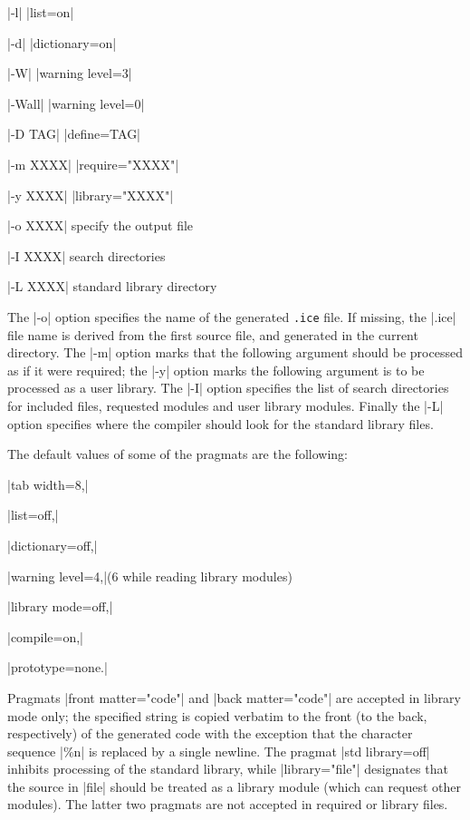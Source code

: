 \documentclass[titlepage]{article}
\begin{document}
\smallskip

\HH \pp|-l| \HE \pp|list=on|

\HH \pp|-d| \HE \pp|dictionary=on|

\HH \pp|-W| \HE \pp|warning level=3|

\HH \pp|-Wall| \HE \pp|warning level=0|

\HH \pp|-D TAG| \HE \pp|define=TAG|

\HH \pp|-m XXXX| \HE \pp|require="XXXX"|

\HH \pp|-y XXXX| \HE \pp|library="XXXX"|

\HH \pp|-o XXXX| \HE specify the output file

\HH \pp|-I XXXX| \HE search directories

\HH \pp|-L XXXX| \HE standard library directory

\smallskip
\noindent
The \pp|-o| option specifies the name of the generated \texttt{.ice} file.
If missing, the \pp|.ice| file name is derived from the first source file,
and generated in the current directory. The \pp|-m| option marks that the
following argument should be processed as if it were required; the \pp|-y|
option marks the following argument is to be processed as a user library.
The \pp|-I| option specifies the list of search directories for included
files, requested modules and user library modules. Finally the \pp|-L|
option specifies where the compiler should look for the standard library
files.

The default values of some of the pragmats are the following:

\HH\pp|tab width=8,|\HE

\HH\pp|list=off,|\HE

\HH\pp|dictionary=off,|\HE

\HH\pp|warning level=4,|\HE (6 while reading library modules)

\HH\pp|library mode=off,|\HE

\HH\pp|compile=on,|\HE

\HH\pp|prototype=none.|\HE

\smallskip
Pragmats \pp|front matter="code"|  and \pp|back matter="code"| are accepted
in library mode only; the specified string is copied verbatim to the front
(to the back, respectively) of the generated code with the exception that
the character sequence \pp|\%n| is replaced by a single newline. The pragmat
\pp|std library=off| inhibits processing of the standard library, while
\pp|library="file"| designates that the source in \pp|file| should be
treated as a library module (which can request other modules). The latter
two pragmats are not accepted in required or library files.
\end{document}
